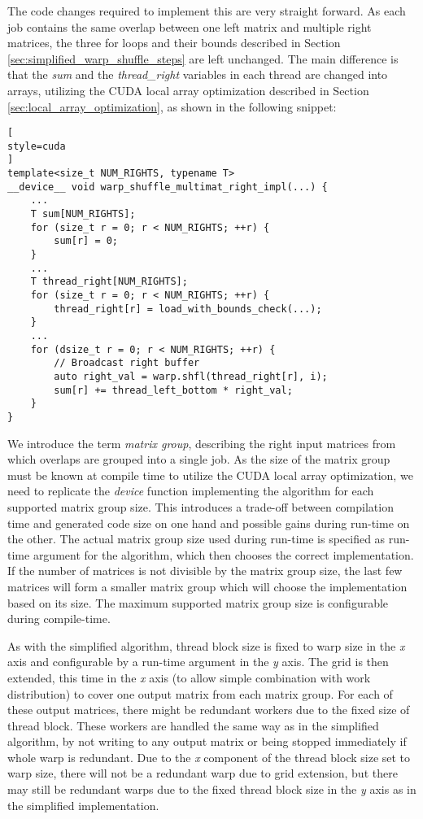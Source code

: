 The code changes required to implement this are very straight forward. As each job contains the same overlap between one left matrix and multiple right matrices, the three for loops and their bounds described in Section \ref{sec:simplified_warp_shuffle_steps} are left unchanged. The main difference is that the \textit{sum} and the \textit{thread\_right} variables in each thread are changed into arrays, utilizing the CUDA local array optimization described in Section \ref{sec:local_array_optimization}, as shown in the following snippet:

\begin{lstlisting}[
style=cuda
]
template<size_t NUM_RIGHTS, typename T>
__device__ void warp_shuffle_multimat_right_impl(...) {
	...
	T sum[NUM_RIGHTS];
	for (size_t r = 0; r < NUM_RIGHTS; ++r) {
		sum[r] = 0;
	}
	...
	T thread_right[NUM_RIGHTS];
	for (size_t r = 0; r < NUM_RIGHTS; ++r) {
		thread_right[r] = load_with_bounds_check(...);
	}
	...
	for (dsize_t r = 0; r < NUM_RIGHTS; ++r) {
		// Broadcast right buffer
		auto right_val = warp.shfl(thread_right[r], i);
		sum[r] += thread_left_bottom * right_val;
	}
}
\end{lstlisting}

We introduce the term \textit{matrix group}, describing the right input matrices from which overlaps are grouped into a single job. As the size of the matrix group must be known at compile time to utilize the CUDA local array optimization, we need to replicate the \textit{device} function implementing the algorithm for each supported matrix group size. This introduces a trade-off between compilation time and generated code size on one hand and possible gains during run-time on the other. The actual matrix group size used during run-time is specified as run-time argument for the algorithm, which then chooses the correct implementation. If the number of matrices is not divisible by the matrix group size, the last few matrices will form a smaller matrix group which will choose the implementation based on its size. The maximum supported matrix group size is configurable during compile-time.


As with the simplified algorithm, thread block size is fixed to warp size in the \textit{x} axis and configurable by a run-time argument in the \textit{y} axis. The grid is then extended, this time in the \textit{x} axis (to allow simple combination with work distribution) to cover one output matrix from each matrix group. For each of these output matrices, there might be redundant workers due to the fixed size of thread block. These workers are handled the same way as in the simplified algorithm, by not writing to any output matrix or being stopped immediately if whole warp is redundant.
Due to the \textit{x} component of the thread block size set to warp size, there will not be a redundant warp due to grid extension, but there may still be redundant warps due to the fixed thread block size in the \textit{y} axis as in the simplified implementation.
 
